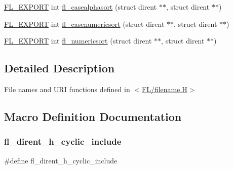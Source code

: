 \begin{DoxyCompactItemize}
\item 
\hyperlink{_fl___export_8_h_aa9ba29a18aee9d738370a06eeb4470fc}{F\+L\+\_\+\+E\+X\+P\+O\+RT} int \hyperlink{group__filenames_ga533169b53070b3286c3aaadf785207ea}{fl\+\_\+casealphasort} (struct dirent $\ast$$\ast$, struct dirent $\ast$$\ast$)
\item 
\hyperlink{_fl___export_8_h_aa9ba29a18aee9d738370a06eeb4470fc}{F\+L\+\_\+\+E\+X\+P\+O\+RT} int \hyperlink{group__filenames_ga0219de041655866e7198f93090d8dd1d}{fl\+\_\+casenumericsort} (struct dirent $\ast$$\ast$, struct dirent $\ast$$\ast$)
\item 
\hyperlink{_fl___export_8_h_aa9ba29a18aee9d738370a06eeb4470fc}{F\+L\+\_\+\+E\+X\+P\+O\+RT} int \hyperlink{group__filenames_ga2800a56e49038e2707b16e7fc340242a}{fl\+\_\+numericsort} (struct dirent $\ast$$\ast$, struct dirent $\ast$$\ast$)
\end{DoxyCompactItemize}


\subsection{Detailed Description}
File names and U\+RI functions defined in $<$\hyperlink{filename_8_h}{F\+L/filename.\+H}$>$ 

\subsection{Macro Definition Documentation}
\mbox{\label{group__filenames_ga611853809ad3600822556b6c9f5b3232}} 
\subsubsection{\texorpdfstring{fl\+\_\+dirent\+\_\+h\+\_\+cyclic\+\_\+include}{fl\_dirent\_h\_cyclic\_include}}
{\footnotesize\ttfamily \#define fl\+\_\+dirent\+\_\+h\+\_\+cyclic\+\_\+include}

\mbox{\label{group__filenames_ga29253083ed9918c2f9d532bd5ed89cc3}} 

